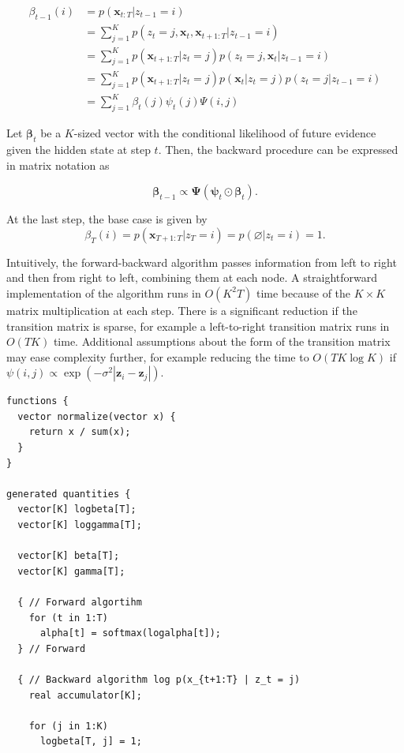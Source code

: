 \documentclass[]{article}
\newcommand{\mat}[1]{\mathbf{#1}}
\begin{document}
{\begin{align*}
\beta_{t-1}(i)
  &= p(\mat{x}_{t:T} | z_{t-1} = i) \\
  &= \sum_{j=1}^{K}{p(z_t =j, \mat{x}_{t}, \mat{x}_{t+1:T} | z_{t-1} = i)} \\
  &= \sum_{j=1}^{K}{p(\mat{x}_{t+1:T} | z_t = j)p(z_t = j, \mat{x}_{t} | z_{t-1} = i)} \\
  &= \sum_{j=1}^{K}{p(\mat{x}_{t+1:T} | z_t = j)p(\mat{x}_t | z_t = j)p(z_t = j | z_{t-1} = i)} \\
  &= \sum_{j=1}^{K}{\beta_t(j) \psi_t(j) \Psi(i, j)}
\end{align*}

Let \(\mat{\beta}_t\) be a \(K\)-sized vector with the conditional
likelihood of future evidence given the hidden state at step \(t\).
Then, the backward procedure can be expressed in matrix notation as

\[
\mat{\beta}_{t-1} \propto \mat{\Psi} (\mat{\psi}_t \odot \mat{\beta}_{t}).
\]

At the last step, the base case is given by \[
\beta_{T}(i)
  = p(\mat{x}_{T+1:T} | z_{T} = i) = p(\varnothing | z_t = i) = 1.
\]

Intuitively, the forward-backward algorithm passes information from left
to right and then from right to left, combining them at each node. A
straightforward implementation of the algorithm runs in \(O(K^2 T)\)
time because of the \(K \times K\) matrix multiplication at each step.
There is a significant reduction if the transition matrix is sparse, for
example a left-to-right transition matrix runs in \(O(TK)\) time.
Additional assumptions about the form of the transition matrix may ease
complexity further, for example reducing the time to \(O(TK\log K)\) if
\(\psi(i, j) \propto \exp(-\sigma^2 |\mat{z}_i - \mat{z}_j|)\).

\begin{verbatim}
functions {
  vector normalize(vector x) {
    return x / sum(x);
  }
}

generated quantities {
  vector[K] logbeta[T];
  vector[K] loggamma[T];

  vector[K] beta[T];
  vector[K] gamma[T];

  { // Forward algortihm
    for (t in 1:T)
      alpha[t] = softmax(logalpha[t]);
  } // Forward

  { // Backward algorithm log p(x_{t+1:T} | z_t = j)
    real accumulator[K];

    for (j in 1:K)
      logbeta[T, j] = 1;


\end{verbatim}}
\end{document}
